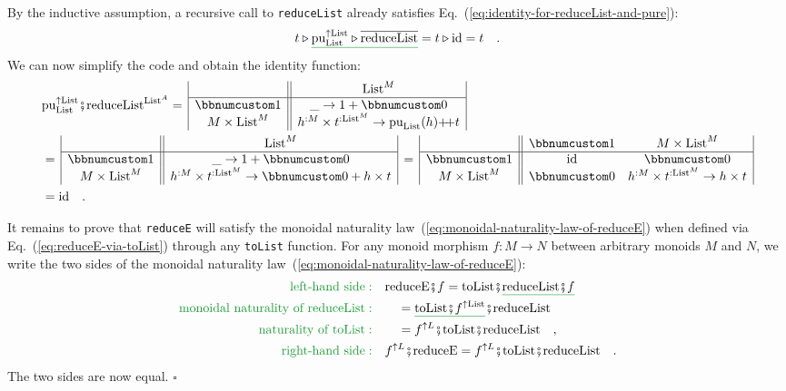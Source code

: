 By the inductive assumption, a recursive call to \lstinline!reduceList!
already satisfies Eq.~(\ref{eq:identity-for-reduceList-and-pure}):
\[
t\triangleright\gunderline{\text{pu}_{\text{List}}^{\uparrow\text{List}}\triangleright\overline{\text{reduceList}}}=t\triangleright\text{id}=t\quad.
\]
We can now simplify the code and obtain the identity function:
\begin{align*}
 & \text{pu}_{\text{List}}^{\uparrow\text{List}}\bef\text{reduceList}^{\text{List}^{A}}=\,\begin{array}{|c||c|}
 & \text{List}^{M}\\
\hline \bbnum 1 & \_\rightarrow1+\bbnum 0\\
M\times\text{List}^{M} & h^{:M}\times t^{:\text{List}^{M}}\rightarrow\text{pu}_{\text{List}}(h)\pplus t
\end{array}\\
 & =\,\begin{array}{|c||c|}
 & \text{List}^{M}\\
\hline \bbnum 1 & \_\rightarrow1+\bbnum 0\\
M\times\text{List}^{M} & h^{:M}\times t^{:\text{List}^{M}}\rightarrow\bbnum 0+h\times t
\end{array}\,=\,\begin{array}{|c||cc|}
 & \bbnum 1 & M\times\text{List}^{M}\\
\hline \bbnum 1 & \text{id} & \bbnum 0\\
M\times\text{List}^{M} & \bbnum 0 & h^{:M}\times t^{:\text{List}^{M}}\rightarrow h\times t
\end{array}\\
 & =\text{id}\quad.
\end{align*}

It remains to prove that \lstinline!reduceE! will satisfy the monoidal
naturality law~(\ref{eq:monoidal-naturality-law-of-reduceE}) when
defined via Eq.~(\ref{eq:reduceE-via-toList}) through any \lstinline!toList!
function. For any monoid morphism $f:M\rightarrow N$ between arbitrary
monoids $M$ and $N$, we write the two sides of the monoidal naturality
law~(\ref{eq:monoidal-naturality-law-of-reduceE}):
\begin{align*}
{\color{greenunder}\text{left-hand side}:}\quad & \text{reduceE}\bef f=\text{toList}\bef\gunderline{\text{reduceList}\bef f}\\
{\color{greenunder}\text{monoidal naturality of }\text{reduceList}:}\quad & \quad=\gunderline{\text{toList}\bef f^{\uparrow\text{List}}}\bef\text{reduceList}\\
{\color{greenunder}\text{naturality of }\text{toList}:}\quad & \quad=f^{\uparrow L}\bef\text{toList}\bef\text{reduceList}\quad,\\
{\color{greenunder}\text{right-hand side}:}\quad & f^{\uparrow L}\bef\text{reduceE}=f^{\uparrow L}\bef\text{toList}\bef\text{reduceList}\quad.
\end{align*}
The two sides are now equal. $\square$

